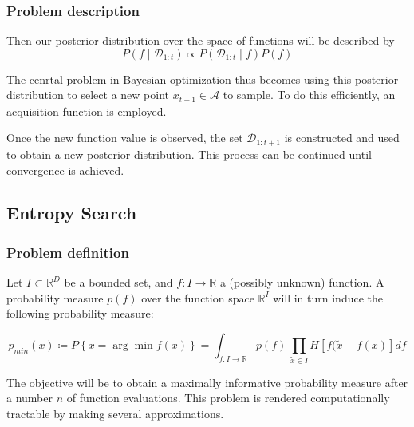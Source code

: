 \documentclass[10pt,handout]{beamer}
\begin{document}


\begin{frame}
\frametitle{Problem description}

Then our posterior distribution over
the space of functions will be described by
\[
	P(f \mid \mathcal{D}_{1:t}) \propto P( \mathcal{D}_{1:t} \mid f) P(f)
\]

The cenrtal problem in Bayesian optimization thus becomes using this posterior
distribution to select a new point $x_{t+1} \in \mathcal{A}$ to sample. To do
this efficiently, an acquisition function is employed.

Once the new function value is observed, the set $\mathcal{D}_{1:t+1}$ is
constructed and used to obtain a new posterior distribution. This process 
can be continued until convergence is achieved.
\end{frame}




\subsection{Entropy Search}

\begin{frame}
\frametitle{Problem definition}

Let $I \subset \mathbb R^D$ be a bounded set, and $f : I \rightarrow \mathbb{R}$
a (possibly unknown) function. A probability measure $p(f)$ over the function
space $\mathbb{R}^I$ will in turn induce the following probability measure:

\[
	p_{min}(x) \coloneqq P \left\{ x = \arg\!\min f(x) \right\} = 
	\int_{f: I \rightarrow \mathbb{R}} p(f) \, 
		\prod_{\widetilde x \in I} H[f(\widetilde{x} - f(x)] df
\]

The objective will be to obtain a maximally informative probability measure
after a number $n$ of function evaluations. This problem is rendered 
computationally tractable by making several approximations. 





\end{frame}
\end{document}

